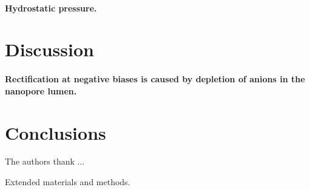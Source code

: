 \documentclass[journal=ancac3, manuscript=article, etalmode=truncate,maxauthors=0]{achemso}
\begin{document}
\paragraph{Hydrostatic pressure.}



\section{Discussion}\label{sect:discussion}

\paragraph{Rectification at negative biases is caused by depletion of anions in the nanopore lumen.}

\section{Conclusions}\label{sect:conclusions}

\begin{acknowledgement}
The authors thank ...
\end{acknowledgement}


\begin{suppinfo}
	Extended materials and methods.
\end{suppinfo}








\newpage %


%
\end{document}
